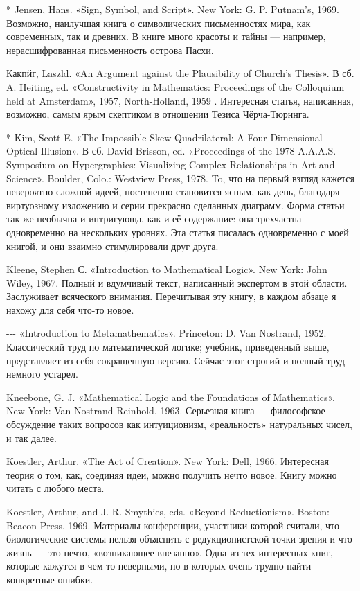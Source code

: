 * Jensen, Hans. «Sign, Symbol, and Script». New York: G. P. Putnam's, 1969. Возможно, наилучшая книга о символических письменностях мира, как современных, так и древних. В книге много красоты и тайны --- например, нерасшифрованная письменность острова Пасхи.

Какпйг, Laszld. «An Argument against the Plausibility of Church's Thesis». В сб. A. Heiting, ed. «Constructivity in Mathematics: Proceedings of the Colloquium held at Amsterdam», 1957, North-Holland, 1959 . Интересная статья, написанная, возможно, самым ярым скептиком в отношении Тезиса Чёрча-Тюрннга.

* Kim, Scott E. «The Impossible Skew Quadrilateral: A Four-Dimensional Optical Illusion». В сб. David Brisson, ed. «Proceedings of the 1978 A.A.A.S. Symposium on Hypergraphics: Visualizing Complex Relationships in Art and Science». Boulder, Colo.: Westview Press, 1978. To, что на первый взгляд кажется невероятно сложной идеей, постепенно становится ясным, как день, благодаря виртуозному изложению и серии прекрасно сделанных диаграмм. Форма статьи так же необычна и интригующа, как и её содержание: она трехчастна одновременно на нескольких уровнях. Эта статья писалась одновременно с моей книгой, и они взаимно стимулировали друг друга.

Kleene, Stephen С. «Introduction to Mathematical Logic». New York: John Wiley, 1967. Полный и вдумчивый текст, написанный экспертом в этой области. Заслуживает всяческого внимания. Перечитывая эту книгу, в каждом абзаце я нахожу для себя что-то новое.

-\/-\/- «Introduction to Metamathematics». Princeton: D. Van Nostrand, 1952. Классический труд по математической логике; учебник, приведенный выше, представляет из себя сокращенную версию. Сейчас этот строгий и полный труд немного устарел.

Kneebone, G. J. «Mathematical Logic and the Foundations of Mathematics». New York: Van Nostrand Reinhold, 1963. Серьезная книга --- философское обсуждение таких вопросов как интуиционизм, «реальность» натуральных чисел, и так далее.

Koestler, Arthur. «The Act of Creation». New York: Dell, 1966. Интересная теория о том, как, соединяя идеи, можно получить нечто новое. Книгу можно читать с любого места.

Koestler, Arthur, and J. R. Smythies, eds. «Beyond Reductionism». Boston: Beacon Press, 1969. Материалы конференции, участники которой считали, что биологические системы нельзя объяснить с редукционистской точки зрения и что жизнь --- это нечто, «возникающее внезапно». Одна из тех интересных книг, которые кажутся в чем-то неверными, но в которых очень трудно найти конкретные ошибки.

